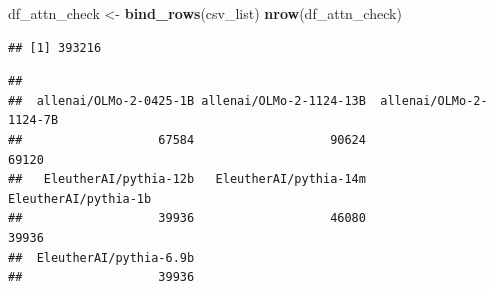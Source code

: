 \documentclass[
]{article}
\newenvironment{Shaded}{\begin{snugshade}}{\end{snugshade}}
\newcommand{\FunctionTok}[1]{\textcolor[rgb]{0.13,0.29,0.53}{\textbf{#1}}}
\newcommand{\NormalTok}[1]{#1}
\newcommand{\OtherTok}[1]{\textcolor[rgb]{0.56,0.35,0.01}{#1}}
\newcommand{\SpecialCharTok}[1]{\textcolor[rgb]{0.81,0.36,0.00}{\textbf{#1}}}
\begin{document}
\begin{Shaded}
\begin{Highlighting}[]
\NormalTok{df\_attn\_check }\OtherTok{\textless{}{-}} \FunctionTok{bind\_rows}\NormalTok{(csv\_list)}
\FunctionTok{nrow}\NormalTok{(df\_attn\_check)}
\end{Highlighting}
\end{Shaded}

\begin{verbatim}
## [1] 393216
\end{verbatim}

\begin{Shaded}
\end{Shaded}

\begin{verbatim}
## 
##  allenai/OLMo-2-0425-1B allenai/OLMo-2-1124-13B  allenai/OLMo-2-1124-7B 
##                   67584                   90624                   69120 
##   EleutherAI/pythia-12b   EleutherAI/pythia-14m    EleutherAI/pythia-1b 
##                   39936                   46080                   39936 
##  EleutherAI/pythia-6.9b 
##                   39936
\end{verbatim}
\end{document}
